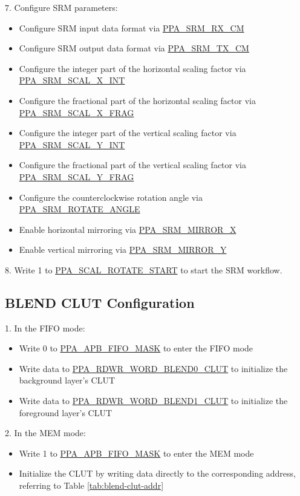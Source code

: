 \documentclass[main\_\_EN.tex]{subfiles}
\begin{document}
7. Configure SRM parameters:
\begin{itemize}
    \item Configure SRM input data format via \hyperref[fielddesc:PPASRMRXCM]{PPA\_SRM\_RX\_CM}
    \item Configure SRM output data format via \hyperref[fielddesc:PPASRMTXCM]{PPA\_SRM\_TX\_CM}
    \item Configure the integer part of the horizontal scaling factor via \hyperref[fielddesc:PPASRMSCALXINT]{PPA\_SRM\_SCAL\_X\_INT}
    \item Configure the fractional part of the horizontal scaling factor via \hyperref[fielddesc:PPASRMSCALXFRAG]{PPA\_SRM\_SCAL\_X\_FRAG}
    \item Configure the integer part of the vertical scaling factor via \hyperref[fielddesc:PPASRMSCALYINT]{PPA\_SRM\_SCAL\_Y\_INT}
    \item Configure the fractional part of the vertical scaling factor via \hyperref[fielddesc:PPASRMSCALYFRAG]{PPA\_SRM\_SCAL\_Y\_FRAG}
    \item Configure the counterclockwise rotation angle via \hyperref[fielddesc:PPASRMROTATEANGLE]{PPA\_SRM\_ROTATE\_ANGLE}
    \item Enable horizontal mirroring via \hyperref[fielddesc:PPASRMMIRRORX]{PPA\_SRM\_MIRROR\_X}
    \item Enable vertical mirroring via \hyperref[fielddesc:PPASRMMIRRORY]{PPA\_SRM\_MIRROR\_Y}
\end{itemize}

8. Write 1 to \hyperref[fielddesc:PPASCALROTATESTART]{PPA\_SCAL\_ROTATE\_START} to start the SRM workflow.

\subsection{BLEND CLUT Configuration}
\label{sec: ppa_blend_clut_config}
1. In the FIFO mode:
\begin{itemize}
    \item Write 0 to \hyperref[fielddesc:PPAAPBFIFOMASK]{PPA\_APB\_FIFO\_MASK} to enter the FIFO mode
    \item Write data to \hyperref[fielddesc:PPARDWRWORDBLEND0CLUT]{PPA\_RDWR\_WORD\_BLEND0\_CLUT} to initialize the background layer's CLUT
    \item Write data to \hyperref[fielddesc:PPARDWRWORDBLEND1CLUT]{PPA\_RDWR\_WORD\_BLEND1\_CLUT} to initialize the foreground layer's CLUT
\end{itemize}
2. In the MEM mode:
\begin{itemize}
    \item Write 1 to \hyperref[fielddesc:PPAAPBFIFOMASK]{PPA\_APB\_FIFO\_MASK} to enter the MEM mode
    \item Initialize the CLUT by writing data directly to the corresponding address, referring to Table \ref{tab:blend-clut-addr}
\end{itemize}
\end{document}
